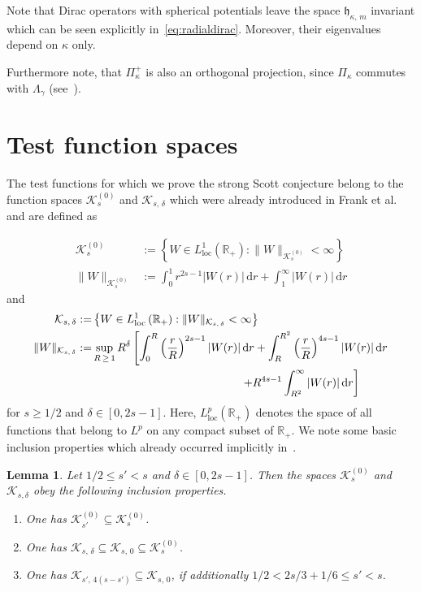 \documentclass[10pt]{amsart}
\newtheorem{lemm}[cdrthm]{Lemma}
\theoremstyle{definition}
\newcommand{\loc}{\mathrm{loc}}
\newcommand*\dr{\mathrm{d}r}
\newcommand*\rz{\mathbb{R}}
\newcommand*\cK{\mathcal{K}}
\newcommand*\gh{\mathfrak{h}}
\begin{document}
Note that Dirac operators with spherical potentials leave the space $\gh_{\kappa,\,m}$ invariant which can be seen explicitly in~\eqref{eq:radialdirac}. Moreover, their eigenvalues depend on $\kappa$ only.

Furthermore note, that $\Pi^+_\kappa$ is also an orthogonal projection, since $\Pi_\kappa$ commutes with $\Lambda_\gamma$ (see~\cite[Equation~(27)]{HandrekSiedentop2015}).

\section{Test function spaces}\label{s:testfunctions}


The test functions for which we prove the strong Scott conjecture belong to the function spaces $\cK_{s}^{(0)}$ and $\cK_{s,\,\delta}$ which were already introduced in Frank et al. \cite{Franketal2020P} and are defined as

\begin{equation}\label{eq:defsigmadeltanod}
\begin{split}
\cK_{s}^{(0)} & :=\left\{W\in L^1_{\loc}\left(\rz_+\right):\|W\|_{\cK_{s}^{(0)}}<\infty\right\}\\
\|W\|_{\cK_{s}^{(0)}} & := \int_0^1 r^{2s-1}|W(r)|\,\dr + \int_1^\infty |W(r)|\,\dr
\end{split}
\end{equation}
and
\begin{equation}\label{eq:defsigmadelta}
\begin{split}
\cK_{s,\,\delta} :=& \left\{W\in L^1_{\loc}\left(\rz_+\right):\|W\|_{\cK_{s,\,\delta}}<\infty\right\}\\
\|W\|_{\cK_{s,\,\delta}} :=& \sup_{R\,\geq\,1} R^\delta\left[\int_0^R \left(\frac{r}{R}\right)^{2s-1}|W(r)|\,\dr + \int_R^{R^2}\left(\frac{r}{R}\right)^{4s-1} |W(r)|\,\dr\right.\\
&\mkern236mu\left.+ R^{4s-1}\int_{R^2}^\infty |W(r)|\,\dr\right]
\end{split}
\end{equation}
for $s\geq1/2$ and $\delta\in[0,2s-1]$. Here, $L^p_{\loc}(\rz_+)$ denotes the space of all functions that belong to $L^p$ on any compact subset of $\rz_+$. We note some basic inclusion properties which already occurred implicitly in~\cite{Franketal2020P}.
\begin{lemm}\label{inclusions}
Let $1/2\leq s'<s$ and $\delta\in[0,2s-1]$. Then the spaces $\cK_{s}^{(0)}$ and $\cK_{s,\delta}$ obey the following inclusion properties.
\begin{enumerate}
\item One has $\cK_{s'}^{(0)}\subseteq\cK_{s}^{(0)}$.

\item One has $\cK_{s,\,\delta}\subseteq\cK_{s,\,0}\subseteq\cK_{s}^{(0)}$.

\item One has $\cK_{s',\,4(s-s')} \subseteq \cK_{s,\,0}$, if additionally $1/2<2s/3+1/6 \leq s'<s$.
\end{enumerate}
\end{lemm}
\end{document}

